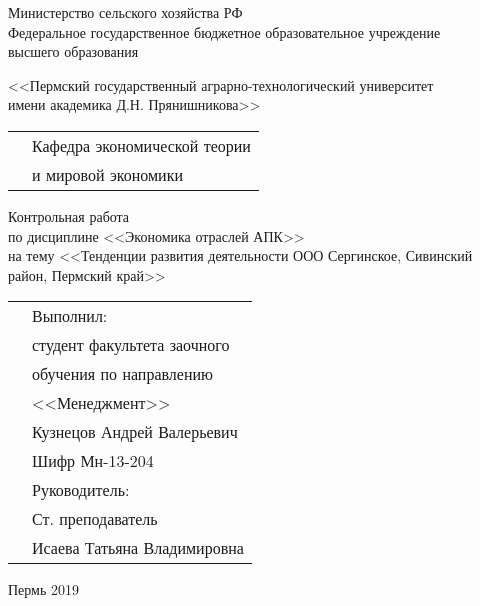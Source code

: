 
\thispagestyle{empty}
\begin{center}
	Министерство сельского хозяйства РФ \\Федеральное государственное бюджетное образовательное учреждение\\ высшего образования
	\vspace{0.5ex}
	
	<<Пермский государственный аграрно-технологический университет\\ имени академика Д.Н. Прянишникова>>
\end{center}
\vspace{10ex}
\begin{tabularx}{\textwidth}{XX}
	& Кафедра экономической теории \\
	& и мировой экономики
\end{tabularx}
\begin{center}
	\vspace{10ex}
	Контрольная работа\\
	по дисциплине <<Экономика отраслей АПК>> \\
	\vspace{1ex}
	на тему <<Тенденции развития деятельности ООО Сергинское, Сивинский район, Пермский край>>
	
\end{center}
	\vspace{6ex}
	\begin{tabularx}{\textwidth}{XX}
	& Выполнил:\\
	& студент факультета заочного \\
	& обучения по направлению \\
	& <<Менеджмент>> \\
	& Кузнецов Андрей Валерьевич \\
	& Шифр Мн-13-204\\
	& Руководитель:\\
	& Ст. преподаватель\\
	& Исаева Татьяна Владимировна\\
	\end{tabularx}
\begin{center}
	\vfill
	Пермь 2019
\end{center}

